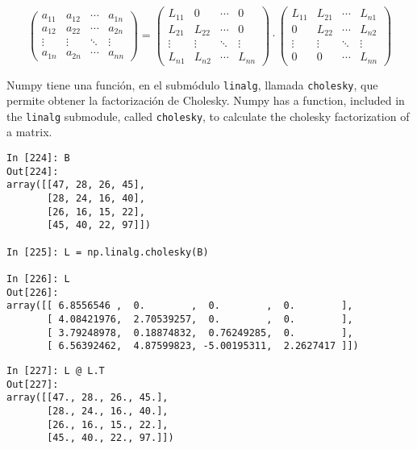 \begin{equation*}
\begin{pmatrix}
a_{11}& a_{12}& \cdots & a_{1n}\\
a_{12}& a_{22}& \cdots & a_{2n}\\
\vdots & \vdots & \ddots & \vdots\\
a_{1n}& a_{2n}& \cdots & a_{nn}
\end{pmatrix}=\begin{pmatrix}
L_{11}& 0& \cdots & 0\\
L_{21}& L_{22}& \cdots & 0\\
\vdots & \vdots & \ddots & \vdots\\
L_{n1}& L_{n2}& \cdots & L_{nn}
\end{pmatrix} \cdot \begin{pmatrix}
L_{11}& L_{21}& \cdots & L_{n1}\\
0& L_{22}& \cdots & L_{n2}\\
\vdots & \vdots & \ddots & \vdots\\
0& 0& \cdots & L_{nn}
\end{pmatrix}
\end{equation*}
\begin{paracol}{2}
Numpy tiene una función, en el submódulo \texttt{linalg}, llamada \texttt{cholesky}, que permite obtener la factorización de Cholesky.
\switchcolumn
Numpy has a function, included in the \texttt{linalg} submodule, called \texttt{cholesky}, to calculate the cholesky factorization of a matrix.
\end{paracol}
\begin{center}
    \begin{minipage}{0.5\textwidth}
    \begin{verbatim}
In [224]: B
Out[224]: 
array([[47, 28, 26, 45],
       [28, 24, 16, 40],
       [26, 16, 15, 22],
       [45, 40, 22, 97]])

In [225]: L = np.linalg.cholesky(B)

In [226]: L
Out[226]: 
array([[ 6.8556546 ,  0.        ,  0.        ,  0.        ],
       [ 4.08421976,  2.70539257,  0.        ,  0.        ],
       [ 3.79248978,  0.18874832,  0.76249285,  0.        ],
       [ 6.56392462,  4.87599823, -5.00195311,  2.2627417 ]])
    \end{verbatim}        
\end{minipage}
\end{center}

\begin{center}
	\begin{minipage}{0.5\textwidth}
		\begin{verbatim}
In [227]: L @ L.T
Out[227]: 
array([[47., 28., 26., 45.],
       [28., 24., 16., 40.],
       [26., 16., 15., 22.],
       [45., 40., 22., 97.]])
    \end{verbatim}        
    \end{minipage}
\end{center}

